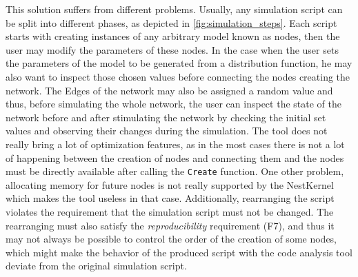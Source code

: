 This solution suffers from different problems. Usually, any simulation script can be split into different phases, as depicted in \ref{fig:simulation_steps}. Each script starts with creating instances of any arbitrary model known as nodes, then the user may modify the parameters of these nodes. In the case when the user sets the parameters of the model to be generated from a distribution function, he may also want to inspect those chosen values before connecting the nodes creating the network. The Edges of the network may also be assigned  a random value and thus, before simulating the whole network, the user can inspect the state of the network before and after stimulating the network by checking the initial set values and observing their changes during the simulation. The tool does not really bring a lot of optimization features, as in the most cases there is not a lot of happening between the creation of nodes and connecting them and the nodes must be directly available after calling the \texttt{Create} function. One other problem, allocating memory for future nodes is not really supported by the NestKernel which makes the tool useless in that case. Additionally, rearranging the script violates the requirement that the simulation script must not be changed. The rearranging must also satisfy the \emph{reproducibility} requirement (F7), and thus it may not always be possible to control the order of the creation of some nodes, which might make the behavior of the produced script with the code analysis tool deviate from the original simulation script.

\vspace{0.5cm}


